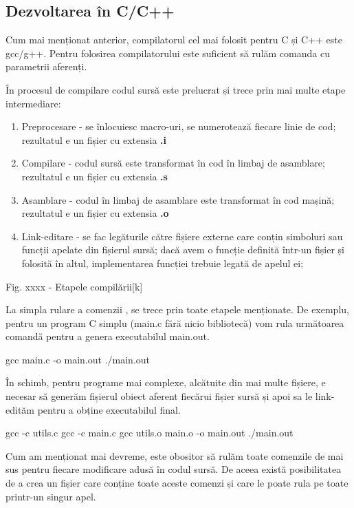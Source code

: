 \subsection{Dezvoltarea în C/C++}
\label{sec:appdev-ideinstall-c-dev}

Cum mai menționat anterior, compilatorul cel mai folosit pentru C și C++ este
gcc/g++. Pentru folosirea compilatorului este suficient să rulăm comanda
 cu parametrii aferenți.

În procesul de compilare codul sursă este prelucrat și trece prin mai multe
etape intermediare:

\begin{enumerate}
	\item Preprocesare - se înlocuiesc macro-uri, se numerotează fiecare
		linie de cod; rezultatul e un fișier cu extensia \textbf{.i}
	\item Compilare - codul sursă este transformat în cod în limbaj de
		asamblare; rezultatul e un fișier cu extensia \textbf{.s}
	\item Asamblare - codul în limbaj de asamblare este transformat în cod
		mașină; rezultatul e un fișier cu extensia \textbf{.o}
	\item Link-editare - se fac legăturile către fișiere externe care conțin
		simboluri sau funcții apelate din fișierul sursă; dacă avem o
		funcție definită într-un fișier și folosită în altul,
		implementarea funcției trebuie legată de apelul ei;
\end{enumerate}

Fig. xxxx - Etapele compilării[k]

La simpla rulare a comenzii , se trece prin toate etapele menționate.
De exemplu, pentru un program C simplu (main.c fără nicio bibliotecă) vom rula
următoarea comandă pentru a genera executabilul main.out.

\begin{screen}
gcc main.c -o main.out
./main.out
\end{screen}

În schimb, pentru programe mai complexe, alcătuite din mai multe fișiere, e
necesar să generăm fișierul obiect aferent fiecărui fișier sursă și apoi sa le
link-edităm pentru a obține executabilul final.

\begin{screen}
gcc -c utils.c
gcc -c main.c
gcc utils.o main.o -o main.out
./main.out
\end{screen}

Cum am menționat mai devreme, este obositor să rulăm toate comenzile de mai sus
pentru fiecare modificare adusă în codul sursă. De aceea există posibilitatea de
a crea un fișier care conține toate aceste comenzi și care le poate rula pe
toate printr-un singur apel.

